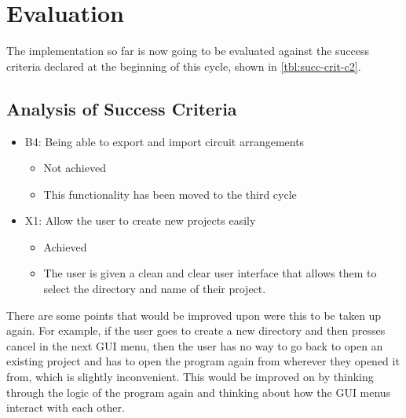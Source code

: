 

\section{Evaluation}
    The implementation so far is now going to be evaluated against the success criteria declared at the beginning of this cycle, shown in \autoref{tbl:succ-crit-c2}. 
    

    \subsection{Analysis of Success Criteria}
    
    \begin{itemize}
        \item B4: Being able to export and import circuit arrangements
        \begin{itemize}
            \item Not achieved
            \item This functionality has been moved to the third cycle
        \end{itemize}
        \item X1: Allow the user to create new projects easily
        \begin{itemize}
            \item Achieved
            \item The user is given a clean and clear user interface that allows them to select the directory and name of their project.
        \end{itemize}
    \end{itemize}




    There are some points that would be improved upon were this to be taken up again. 
    For example, if the user goes to create a new directory and then presses cancel in the next GUI menu, then the user has no way to go back to open an existing project and has to open the program again from wherever they opened it from, which is slightly inconvenient. 
    This would be improved on by thinking through the logic of the program again and thinking about how the GUI menus interact with each other. 


